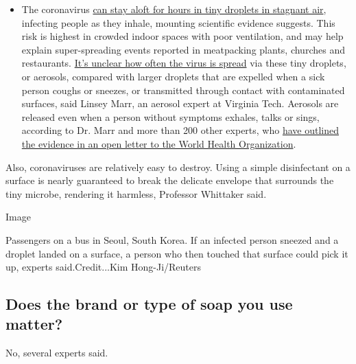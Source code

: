 \begin{itemize}
  \begin{itemize}
  \tightlist
  \item
    The coronavirus
    \href{https://www.nytimes3xbfgragh.onion/2020/07/04/health/239-experts-with-one-big-claim-the-coronavirus-is-airborne.html?action=click\&pgtype=Article\&state=default\&region=MAIN_CONTENT_3\&context=storylines_faq}{can
    stay aloft for hours in tiny droplets in stagnant air}, infecting
    people as they inhale, mounting scientific evidence suggests. This
    risk is highest in crowded indoor spaces with poor ventilation, and
    may help explain super-spreading events reported in meatpacking
    plants, churches and restaurants.
    \href{https://www.nytimes3xbfgragh.onion/2020/07/06/health/coronavirus-airborne-aerosols.html?action=click\&pgtype=Article\&state=default\&region=MAIN_CONTENT_3\&context=storylines_faq}{It's
    unclear how often the virus is spread} via these tiny droplets, or
    aerosols, compared with larger droplets that are expelled when a
    sick person coughs or sneezes, or transmitted through contact with
    contaminated surfaces, said Linsey Marr, an aerosol expert at
    Virginia Tech. Aerosols are released even when a person without
    symptoms exhales, talks or sings, according to Dr. Marr and more
    than 200 other experts, who
    \href{https://academic.oup.com/cid/article/doi/10.1093/cid/ciaa939/5867798}{have
    outlined the evidence in an open letter to the World Health
    Organization}.
  \end{itemize}
\end{itemize}

Also, coronaviruses are relatively easy to destroy. Using a simple
disinfectant on a surface is nearly guaranteed to break the delicate
envelope that surrounds the tiny microbe, rendering it harmless,
Professor Whittaker said.

Image

Passengers on a bus in Seoul, South Korea. If an infected person sneezed
and a droplet landed on a surface, a person who then touched that
surface could pick it up, experts said.Credit...Kim Hong-Ji/Reuters

\hypertarget{does-the-brand-or-type-of-soap-you-use-matter}{%
\subsection{Does the brand or type of soap you use
matter?}\label{does-the-brand-or-type-of-soap-you-use-matter}}

No, several experts said.

